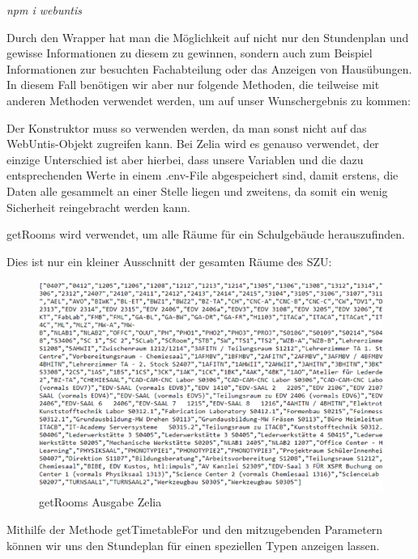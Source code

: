 \emph{npm i webuntis}

Durch den Wrapper hat man die Möglichkeit auf nicht nur den Stundenplan und gewisse Informationen zu diesem zu gewinnen, sondern auch zum Beispiel Informationen zur besuchten Fachabteilung oder das Anzeigen von Hausübungen. In diesem Fall benötigen wir aber nur folgende Methoden, die teilweise mit anderen Methoden verwendet werden, um auf unser Wunschergebnis zu kommen:



Der Konstruktor muss so verwenden werden, da man sonst nicht auf das WebUntis-Objekt zugreifen kann. Bei Zelia wird es genauso verwendet, der einzige Unterschied ist aber hierbei, dass unsere Variablen und die dazu entsprechenden Werte in einem .env-File abgespeichert sind, damit erstens, die Daten alle gesammelt an einer Stelle liegen und zweitens, da somit ein wenig Sicherheit reingebracht werden kann.


getRooms wird verwendet, um alle Räume für ein Schulgebäude herauszufinden.


Dies ist nur ein kleiner Ausschnitt der gesamten Räume des SZU:

\begin{figure}[H]
    \centering
    \includegraphics{media/WebUntis/getRoomsAusgabe.png}
    \caption{getRooms Ausgabe Zelia}
\end{figure}

Mithilfe der Methode getTimetableFor und den mitzugebenden Parametern können wir uns den Stundeplan für einen speziellen Typen anzeigen lassen.

